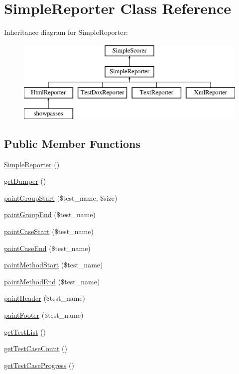 \hypertarget{class_simple_reporter}{
\section{SimpleReporter Class Reference}
\label{class_simple_reporter}
}
Inheritance diagram for SimpleReporter:\begin{figure}[H]
\begin{center}
\leavevmode
\includegraphics[height=4.000000cm]{class_simple_reporter}
\end{center}
\end{figure}
\subsection*{Public Member Functions}
\begin{DoxyCompactItemize}
\item 
\hyperlink{class_simple_reporter_a7fd4aba19a7aa84b0a099f7d6b532a19}{SimpleReporter} ()
\item 
\hyperlink{class_simple_reporter_a784aae8c64539f2ac2f7bb8e9db65628}{getDumper} ()
\item 
\hyperlink{class_simple_reporter_a3e8ad3ae451da1c3ae1e90c5789f7f2b}{paintGroupStart} (\$test\_\-name, \$size)
\item 
\hyperlink{class_simple_reporter_a2b6b699cadeb44f4dc666f3c94ac22be}{paintGroupEnd} (\$test\_\-name)
\item 
\hyperlink{class_simple_reporter_a987d5bbfa2cc927da394f6bc6053c23e}{paintCaseStart} (\$test\_\-name)
\item 
\hyperlink{class_simple_reporter_a8e6c0fb28e29920fe42eef652f822753}{paintCaseEnd} (\$test\_\-name)
\item 
\hyperlink{class_simple_reporter_a54672d58e0fad0e0e672159dd4f61124}{paintMethodStart} (\$test\_\-name)
\item 
\hyperlink{class_simple_reporter_a0ad8baf509606e35dec1bbefddef3fc0}{paintMethodEnd} (\$test\_\-name)
\item 
\hyperlink{class_simple_reporter_a682fc7003bca1442734b7ddbdf270b75}{paintHeader} (\$test\_\-name)
\item 
\hyperlink{class_simple_reporter_a447a6e823a5c17b1bd5f922a0b18fded}{paintFooter} (\$test\_\-name)
\item 
\hyperlink{class_simple_reporter_aa4bce8bfcd41c7ec33a22866f2b170a9}{getTestList} ()
\item 
\hyperlink{class_simple_reporter_a218fb7c8ac145e848243d29d712fd27f}{getTestCaseCount} ()
\item 
\hyperlink{class_simple_reporter_aa9b00069b10e54522095ef9d65dddd44}{getTestCaseProgress} ()
\end{DoxyCompactItemize}
